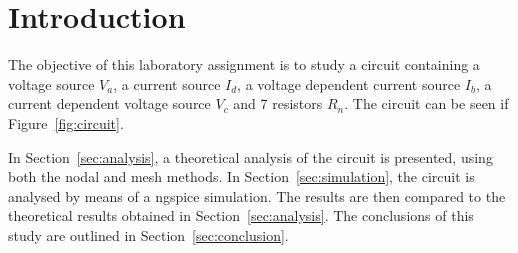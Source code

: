 \section{Introduction}
\label{sec:introduction}

The objective of this laboratory assignment is to study a circuit containing a voltage source $V_a$,
a current source $I_d$, a voltage dependent current source $I_b$, a current dependent voltage source 
$V_c$ and 7 resistors $R_n$. The circuit can be seen if Figure~\ref{fig:circuit}.

In Section~\ref{sec:analysis}, a theoretical analysis of the circuit is
presented, using both the nodal and mesh methods. In Section~\ref{sec:simulation}, the circuit is analysed by
means of a ngspice simulation. The results are then compared to the theoretical results obtained in
Section~\ref{sec:analysis}. The conclusions of this study are outlined in
Section~\ref{sec:conclusion}.


